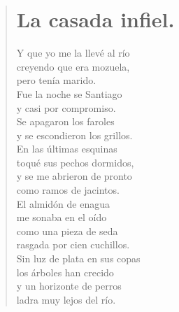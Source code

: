 \documentclass[12pt, twoside]{book}
\begin{document}
\begin{verse}
\begin{center}
\section{La casada infiel.}
\end{center}
Y que yo me la llevé al río\\
creyendo que era mozuela,\\
pero tenía marido.\\
Fue la noche se Santiago\\
y casi por compromiso.\\
Se apagaron los faroles\\
y se escondieron los grillos.\\
En las últimas esquinas\\
toqué sus pechos dormidos,\\
y se me abrieron de pronto\\
como ramos de jacintos.\\
El almidón de enagua\\
me sonaba en el oído\\
como una pieza de seda\\
rasgada por cien cuchillos.\\
Sin luz de plata en sus copas\\
los árboles han crecido\\
y un horizonte de perros\\
ladra muy lejos del río.\newline


\end{verse}
\end{document}

